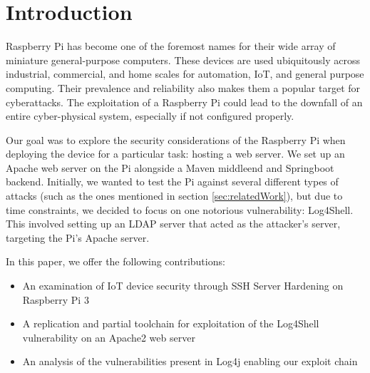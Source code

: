 \documentclass[sigconf]{acmart}
\begin{document}
\maketitle


\section{Introduction}

Raspberry Pi has become one of the foremost names for their wide array of miniature general-purpose computers. These
devices are used ubiquitously across industrial, commercial, and home scales for automation, IoT, and general purpose computing.
Their prevalence and reliability also makes them a popular target for cyberattacks. The exploitation of a Raspberry Pi could
lead to the downfall of an entire cyber-physical system, especially if not configured properly. 

Our goal was to explore the security considerations of the Raspberry Pi when deploying the device for a particular task: hosting a web
server. We set up an Apache web server on the Pi alongside a Maven middleend and Springboot backend. Initially, we wanted to
test the Pi against several different types of attacks (such as the ones mentioned in section \ref{sec:relatedWork}), but due to time
constraints, we decided to focus on one notorious vulnerability: Log4Shell. This involved setting up an LDAP server that acted
as the attacker's server, targeting the Pi's Apache server.


In this paper, we offer the following contributions:
\begin{itemize}
  \item An examination of IoT device security through SSH Server Hardening on Raspberry Pi 3
  \item A replication and partial toolchain for exploitation of the Log4Shell vulnerability on an Apache2 web server
  \item An analysis of the vulnerabilities present in Log4j enabling our exploit chain
\end{itemize}
\end{document}
